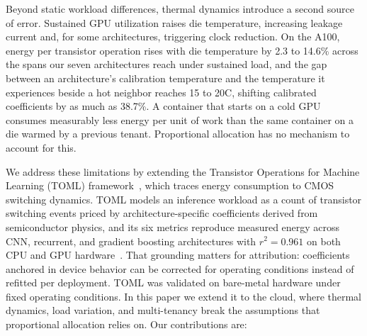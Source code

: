 \documentclass[conference]{IEEEtran}
\begin{document}
Beyond static workload differences, thermal dynamics introduce a second source of error. Sustained GPU utilization raises die temperature, increasing leakage current and, for some architectures, triggering clock reduction. On the A100, energy per transistor operation rises with die temperature by 2.3 to 14.6\% across the spans our seven architectures reach under sustained load, and the gap between an architecture's calibration temperature and the temperature it experiences beside a hot neighbor reaches 15 to 20\textdegree C, shifting calibrated coefficients by as much as 38.7\%. A container that starts on a cold GPU consumes measurably less energy per unit of work than the same container on a die warmed by a previous tenant. Proportional allocation has no mechanism to account for this.

We address these limitations by extending the Transistor Operations for Machine Learning (TOML) framework~\cite{syed2026toml}, which traces energy consumption to CMOS switching dynamics. TOML models an inference workload as a count of transistor switching events priced by architecture-specific coefficients derived from semiconductor physics, and its six metrics reproduce measured energy across CNN, recurrent, and gradient boosting architectures with $r^2 = 0.961$ on both CPU and GPU hardware~\cite{syed2026toml}. That grounding matters for attribution: coefficients anchored in device behavior can be corrected for operating conditions instead of refitted per deployment. TOML was validated on bare-metal hardware under fixed operating conditions. In this paper we extend it to the cloud, where thermal dynamics, load variation, and multi-tenancy break the assumptions that proportional allocation relies on. Our contributions are:
\end{document}
